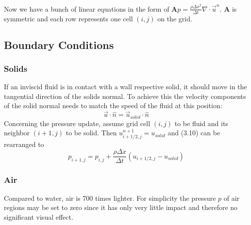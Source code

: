 Now we have a bunch of linear equations in the form of $\mathbf{A}p = \frac{\rho \Delta x^2}{\Delta t}\nabla \cdot \vec{u}^n$. $\mathbf{A}$ is symmetric and each row represents one cell $(i, j)$ on the grid. 


\subsection{Boundary Conditions}
\subsubsection{Solids}
If an inviscid fluid is in contact with a wall respective solid, it should move in the tangential direction of the solids normal. To achieve this the velocity components of the solid normal needs to match the speed of the fluid at this position:
\begin{equation} \label{navier-stokes12}
	\vec{u} \cdot \hat{n} = \vec{u}_{solid} \cdot \hat{n}
\end{equation}
Concerning the pressure update, assume grid cell $(i,j)$ to be fluid and its neighbor $(i+1,j)$ to be solid. Then $u_{i+1/2,j}^{n+1} = u_{solid}$ and (3.10) can be rearranged to 
\begin{equation} \label{navier-stokes12}
	p_{i+1,j} = p_{i,j} + \frac{\rho \Delta x}{\Delta t} (u_{i+1/2,j} - u_{solid})
\end{equation}

\subsubsection{Air}
Compared to water, air is 700 times lighter. For simplicity the pressure $p$ of air regions may be set to zero since it has only very little impact and therefore no significant visual effect.
